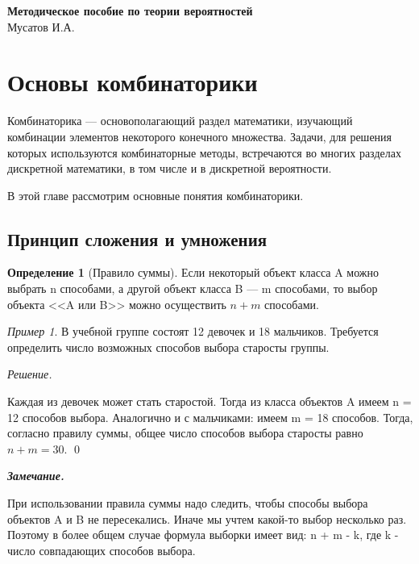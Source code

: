 \documentclass[12pt,a4paper]{article}
\theoremstyle{definition}
\newtheorem{definition}{Определение}[section]
\theoremstyle{definition}
\theoremstyle{remark}
\newenvironment{remark}{
  \par\noindent\textbf{\textit{Замечание.}}~
}{\par}
\theoremstyle{corollary}
\newcommand{\nextblock}{\vspace{1.5em}\noindent}
\theoremstyle{bolditalic}
\newtheorem{example}{Пример}[section]
\newenvironment{solution}{
    \vspace{0.5em}
    \noindent\textit{Решение.}
}{\qed\vspace{1em}}
\begin{document}
\begin{center}
    {\LARGE \textbf{Методическое пособие по теории вероятностей}}\\[1em]
    {\large Мусатов И.А.}
\end{center}

\tableofcontents
\thispagestyle{empty}
\newpage

\section{Основы комбинаторики}

Комбинаторика --- основополагающий раздел математики, изучающий комбинации элементов некоторого конечного множества. Задачи, для решения которых используются комбинаторные методы, встречаются во многих разделах дискретной математики, в том числе и в дискретной вероятности.

В этой главе рассмотрим основные понятия комбинаторики.

\subsection{Принцип сложения и умножения}

\begin{definition}[Правило суммы]
Если некоторый объект класса A можно выбрать n способами, а другой объект класса B --- m способами, то выбор объекта <<A или B>> можно осуществить $n + m$ способами.
\end{definition}
\begin{example}
    В учебной группе состоят 12 девочек и 18 мальчиков. Требуется определить число возможных способов выбора старосты группы.
\end{example}
\begin{solution}
    Каждая из девочек может стать старостой. Тогда из класса объектов A имеем n = 12 способов выбора. Аналогично и с мальчиками: имеем m = 18 способов. Тогда, согласно правилу суммы, общее число способов выбора старосты равно $n + m = 30$.
\end{solution}
\begin{remark}
    При использовании правила суммы надо следить, чтобы способы выбора объектов A и B не пересекались. Иначе мы учтем какой-то выбор несколько раз. Поэтому в более общем случае формула выборки имеет вид: n + m - k, где k - число совпадающих способов выбора.
\end{remark}

\nextblock
\end{document}
